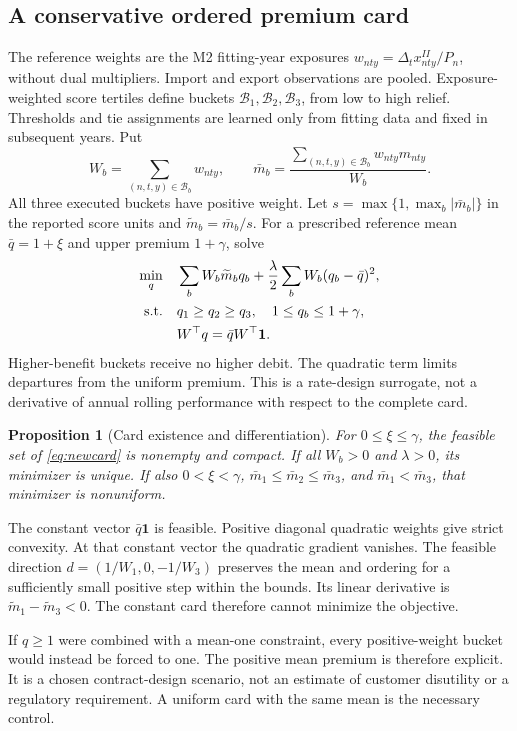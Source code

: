 \documentclass[10pt,journal]{IEEEtran}
\newtheorem{proposition}{Proposition}
\newcommand{\one}{\mathbf 1}
\begin{document}
\subsection{A conservative ordered premium card}
The reference weights are the M2 fitting-year exposures $w_{nty}=\Delta_tx_{nty}^{II}/P_n$, without dual multipliers. Import and export observations are pooled. Exposure-weighted score tertiles define buckets $\mathcal B_1,\mathcal B_2,\mathcal B_3$, from low to high relief. Thresholds and tie assignments are learned only from fitting data and fixed in subsequent years. Put
\begin{equation}
W_b=\sum_{(n,t,y)\in\mathcal B_b}w_{nty},\qquad
\bar m_b=\frac{\sum_{(n,t,y)\in\mathcal B_b}w_{nty}m_{nty}}{W_b}.
\label{eq:bucket}
\end{equation}
All three executed buckets have positive weight. Let $s=\max\{1,\max_b|\bar m_b|\}$ in the reported score units and $\widetilde m_b=\bar m_b/s$. For a prescribed reference mean $\bar q=1+\xi$ and upper premium $1+\gamma$, solve
\begin{align}
\min_q\quad&\sum_bW_b\widetilde m_bq_b+
\frac{\lambda}{2}\sum_bW_b(q_b-\bar q)^2,\notag\\
\text{s.t.}\quad&q_1\geq q_2\geq q_3,\quad1\leq q_b\leq1+\gamma,\notag\\
&W^\top q=\bar qW^\top\one.
\label{eq:newcard}
\end{align}
Higher-benefit buckets receive no higher debit. The quadratic term limits departures from the uniform premium. This is a rate-design surrogate, not a derivative of annual rolling performance with respect to the complete card.

\begin{proposition}[Card existence and differentiation]
\label{prop:card}
For $0\leq\xi\leq\gamma$, the feasible set of \eqref{eq:newcard} is nonempty and compact. If all $W_b>0$ and $\lambda>0$, its minimizer is unique. If also $0<\xi<\gamma$, $\bar m_1\leq\bar m_2\leq\bar m_3$, and $\bar m_1<\bar m_3$, that minimizer is nonuniform.
\end{proposition}
\begin{IEEEproof}
The constant vector $\bar q\one$ is feasible. Positive diagonal quadratic weights give strict convexity. At that constant vector the quadratic gradient vanishes. The feasible direction $d=(1/W_1,0,-1/W_3)$ preserves the mean and ordering for a sufficiently small positive step within the bounds. Its linear derivative is $\widetilde m_1-\widetilde m_3<0$. The constant card therefore cannot minimize the objective.
\end{IEEEproof}
If $q\geq1$ were combined with a mean-one constraint, every positive-weight bucket would instead be forced to one. The positive mean premium is therefore explicit. It is a chosen contract-design scenario, not an estimate of customer disutility or a regulatory requirement. A uniform card with the same mean is the necessary control.
\end{document}
